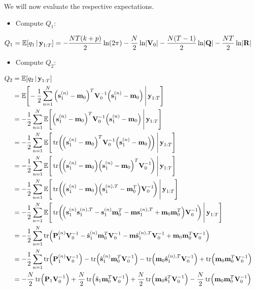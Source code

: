 		We will now evaluate the respective expectations.
		\begin{itemize}
			\item Compute \(Q_1\):
		\end{itemize}
		\begin{equation*}
			Q_1 = \mathbb{E}[q_1 \,\vert\, \boldsymbol{\mathrm{y}}_{1:T}] = -\frac{NT(k + p)}{2} \ln(2\pi) - \frac{N}{2} \ln \lvert \boldsymbol{\mathrm{V}}_0 \rvert - \frac{N(T - 1)}{2} \ln \lvert \boldsymbol{\mathrm{Q}} \rvert - \frac{NT}{2} \ln \lvert \boldsymbol{\mathrm{R}} \rvert
		\end{equation*}

		\begin{itemize}
			\item Compute \(Q_2\):
		\end{itemize}
		\begin{align*}  \allowdisplaybreaks
			Q_2
				&= \E[q_2 \given \vec{y}_{1:T}] \\
				&= \E\Bigg[\! -\frac{1}{2} \sum_{n = 1}^{N} \Big( \vec{s}_1^{(n)} - \vec{m}_0 \Big)^T \mat{V}_0^{-1} \Big( \vec{s}_1^{(n)} - \vec{m}_0 \Big) \Bigggiven \vec{y}_{1:T} \Bigg] \\
				&= -\frac{1}{2} \sum_{n = 1}^{N} \E\Bigg[ \Big( \vec{s}_1^{(n)} - \vec{m}_0 \Big)^T \mat{V}_0^{-1} \Big( \vec{s}_1^{(n)} - \vec{m}_0 \Big) \Bigggiven \vec{y}_{1:T} \Bigg] \\
				&= -\frac{1}{2} \sum_{n = 1}^{N} \E\Bigg[ \tr\!\bigg(\!\Big( \vec{s}_1^{(n)} - \vec{m}_0 \Big)^T \mat{V}_0^{-1} \Big( \vec{s}_1^{(n)} - \vec{m}_0 \Big)\!\bigg) \Bigggiven \vec{y}_{1:T} \Bigg] \\
				&= -\frac{1}{2} \sum_{n = 1}^{N} \E\Bigg[ \tr\!\bigg(\!\Big( \vec{s}_1^{(n)} - \vec{m}_0 \Big) \Big( \vec{s}_1^{(n)} - \vec{m}_0 \Big)^T \mat{V}_0^{-1} \!\bigg) \Bigggiven \vec{y}_{1:T} \Bigg] \\
				&= -\frac{1}{2} \sum_{n = 1}^{N} \E\Bigg[ \tr\!\bigg(\!\Big( \vec{s}_1^{(n)} - \vec{m}_0 \Big) \Big( \vec{s}_1^{(n), T} - \vec{m}_0^T \Big) \mat{V}_0^{-1} \!\bigg) \Bigggiven \vec{y}_{1:T} \Bigg] \\
				&= -\frac{1}{2} \sum_{n = 1}^{N} \E\Bigg[ \tr\!\bigg(\! \Big( \vec{s}_1^{(n)} \vec{s}_1^{(n), T} - \vec{s}_1^{(n)} \vec{m}_0^T - \vec{m} \vec{s}_1^{(n), T} + \vec{m}_0 \vec{m}_0^T \Big) \mat{V}_0^{-1} \!\bigg) \Bigggiven \vec{y}_{1:T} \Bigg] \\
				&= -\frac{1}{2} \sum_{n = 1}^{N} \tr\!\Big( \mat{P}_1^{(n)} \mat{V}_0^{-1} - \hat{\vec{s}}_1^{(n)} \vec{m}_0^T \mat{V}_0^{-1} - \vec{m} \hat{\vec{s}}_1^{(n), T} \mat{V}_0^{-1} + \vec{m}_0 \vec{m}_0^T \mat{V}_0^{-1} \Big) \\
				&= -\frac{1}{2} \sum_{n = 1}^{N} \tr\!\Big( \mat{P}_1^{(n)} \mat{V}_0^{-1} \Big) - \tr\!\Big( \hat{\vec{s}}_1^{(n)} \vec{m}_0^T \mat{V}_0^{-1} \Big) - \tr\!\Big( \vec{m}_0 \hat{\vec{s}}_1^{(n), T} \mat{V}_0^{-1} \Big) + \tr\!\Big(\vec{m}_0 \vec{m}_0^T \mat{V}_0^{-1} \Big) \\
				&=  -\frac{N}{2} \tr\!\Big( \mat{P}_1 \mat{V}_0^{-1} \Big) + \frac{N}{2} \tr\!\Big( \hat{\vec{s}}_1 \vec{m}_0^T \mat{V}_0^{-1} \Big) + \frac{N}{2} \tr\!\Big( \vec{m}_0 \hat{\vec{s}}_1^T \mat{V}_0^{-1} \Big) - \frac{N}{2} \tr\!\Big(\vec{m}_0 \vec{m}_0^T \mat{V}_0^{-1} \Big)
		\end{align*}

